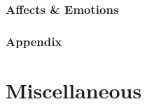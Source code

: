 \documentclass{article}
\begin{document}
\subsubsection{Affects \& Emotions}

\subsubsection{Appendix}


\section{Miscellaneous}


\printbibliography[heading=bibintoc]
	
\end{document}
